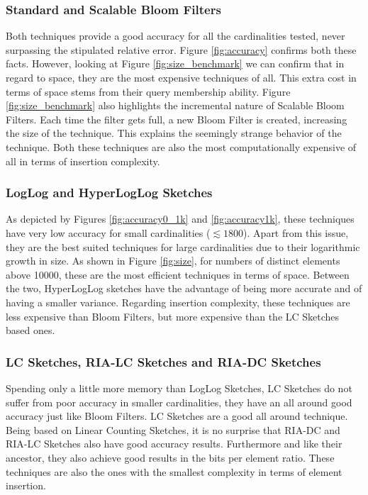 \subsubsection{Standard and Scalable Bloom Filters}
Both techniques provide a good accuracy for all the cardinalities
tested, never surpassing the stipulated relative error. Figure
\ref{fig:accuracy} confirms both these facts. However, looking at
Figure \ref{fig:size_benchmark} we can confirm that in regard to
space, they are the most expensive techniques of all. This extra cost
in terms of space stems from their query membership ability. Figure
\ref{fig:size_benchmark} also highlights the incremental nature of
Scalable Bloom Filters. Each time the filter gets full, a new Bloom
Filter is created, increasing the size of the technique. This explains
the seemingly strange behavior of the technique. Both these techniques
are also the most computationally expensive of all in terms of
insertion complexity.

\subsubsection{LogLog and HyperLogLog Sketches}
As depicted by Figures \ref{fig:accuracy0_1k} and
\ref{fig:accuracy1k}, these techniques have very low accuracy for
small cardinalities ($\lesssim 1800$). Apart from this issue, they are
the best suited techniques for large cardinalities due to their
logarithmic growth in size. As shown in Figure \ref{fig:size}, for
numbers of distinct elements above 10000, these are the most efficient
techniques in terms of space. Between the two, HyperLogLog sketches have
the advantage of being more accurate and of having a smaller
variance. Regarding insertion complexity, these techniques are less
expensive than Bloom Filters, but more expensive than the LC Sketches
based ones.

\subsubsection{LC Sketches, RIA-LC Sketches and RIA-DC Sketches}
Spending only a little more memory than LogLog Sketches, LC Sketches
do not suffer from poor accuracy in smaller cardinalities, they have
an all around good accuracy just like Bloom Filters. LC Sketches are
a good all around technique. Being based on Linear Counting Sketches,
it is no surprise that RIA-DC and RIA-LC Sketches also have good
accuracy results. Furthermore and like their ancestor, they also
achieve good results in the bits per element ratio. These techniques
are also the ones with the smallest complexity in
terms of element insertion. \\ \\

